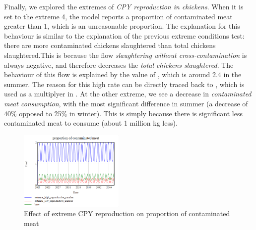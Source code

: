 Finally, we explored the extremes of \textit{CPY reproduction in chickens}. When it is set to the extreme 4, the model reports a proportion of contaminated meat greater than 1, which is an unreasonable proportion. The explanation for this behaviour is similar to the explanation of the previous extreme conditions test: there are more contaminated chickens slaughtered than total chickens slaughtered.This is because the flow \textit{slaughtering without cross-contamination} is always negative, and therefore decreases the \textit{total chickens slaughtered}. The behaviour of this flow is explained by the value of , which is around 2.4 in the summer. The reason for this high rate can be directly traced back to , which is used as a multiplyer in . At the other extreme, we see a decrease in \textit{contaminated meat consumption}, with the most significant difference in summer (a decrease of 40\% opposed to 25\% in winter). This is simply because there is significant less contaminated meat to consume (about 1 million kg less).

\begin{figure}[h!]
    \centering
    \includegraphics[width=0.45\textwidth]{images/extremes/CPY_reproduction_contaminated_meat.png} 
    \caption{Effect of extreme CPY reproduction on proportion of contaminated meat}
    \label{fig:reproduction_meat}
\end{figure}




